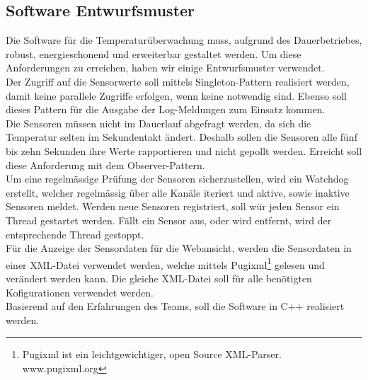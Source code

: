 \subsection{Software Entwurfsmuster}
Die Software für die Temperaturüberwachung muss, aufgrund des Dauerbetriebes, robust, energieschonend und erweiterbar gestaltet werden. Um diese Anforderungen zu erreichen, haben wir einige Entwurfsmuster verwendet.\\
Der Zugriff auf die Sensorwerte soll mittels Singleton-Pattern realisiert werden, damit keine parallele Zugriffe erfolgen, wenn keine notwendig sind. Ebenso soll dieses Pattern für die Ausgabe der Log-Meldungen zum Einsatz kommen.\\
Die Sensoren müssen nicht im Dauerlauf abgefragt werden, da sich die Temperatur selten im Sekundentakt ändert. Deshalb sollen die Sensoren alle fünf bis zehn Sekunden ihre Werte rapportieren und nicht gepollt werden. Erreicht soll diese Anforderung mit dem Observer-Pattern.\\
Um eine regelmässige Prüfung der Sensoren sicherzustellen, wird ein Watchdog erstellt, welcher regelmässig über alle Kanäle iteriert und aktive, sowie inaktive Sensoren meldet. Werden neue Sensoren registriert, soll wür jeden Sensor ein Thread gestartet werden. Fällt ein Sensor aus, oder wird entfernt, wird der entsprechende Thread gestoppt.\\
Für die Anzeige der Sensordaten für die Webansicht, werden die Sensordaten in einer XML-Datei verwendet werden, welche mittels Pugixml\footnote{Pugixml ist ein leichtgewichtiger, open Source XML-Parser. www.pugixml.org} gelesen und verändert werden kann. Die gleiche XML-Datei soll für alle benötigten Kofigurationen verwendet werden.\\
Basierend auf den Erfahrungen des Teams, soll die Software in C++ realisiert werden.
